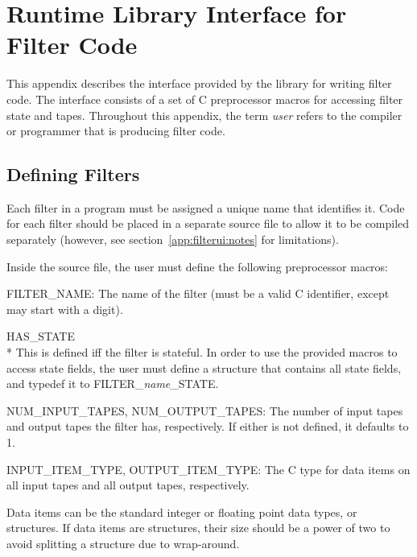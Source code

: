 \chapter{Runtime Library Interface for Filter Code}\label{app:filterui}

This appendix describes the interface provided by the library for writing filter code. The interface consists of a set of C preprocessor macros for accessing filter state and tapes. Throughout this appendix, the term \emph{user} refers to the compiler or programmer that is producing filter code.

\section{Defining Filters}

Each filter in a program must be assigned a unique name that identifies it. Code for each filter should be placed in a separate source file to allow it to be compiled separately (however, see section~\ref{app:filterui:notes} for limitations).

Inside the source file, the user must define the following preprocessor macros:
\begin{description}
\item \textsf{FILTER\_NAME}: The name of the filter (must be a valid C identifier, except may start with a digit).

\item \textsf{HAS\_STATE}~\\*
This is defined iff the filter is stateful. In order to use the provided macros to access state fields, the user must define a structure that contains all state fields, and \textsf{typedef} it to \textsf{FILTER\_\emph{name}\_STATE}.

\item \textsf{NUM\_INPUT\_TAPES}, \textsf{NUM\_OUTPUT\_TAPES}: The number of input tapes and output tapes the filter has, respectively. If either is not defined, it defaults to 1.

\item \textsf{INPUT\_ITEM\_TYPE}, \textsf{OUTPUT\_ITEM\_TYPE}: The C type for data items on all input tapes and all output tapes, respectively.

Data items can be the standard integer or floating point data types, or structures. If data items are structures, their size should be a power of two to avoid splitting a structure due to wrap-around.
\end{description}

